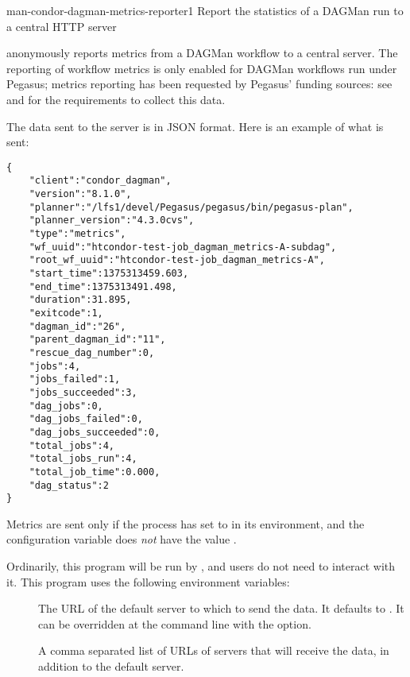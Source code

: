 \begin{ManPage}{}{man-condor-dagman-metrics-reporter}{1}
{Report the statistics of a DAGMan run to a central HTTP server}


\Synopsis {}

\Description

 anonymously reports metrics from
a DAGMan workflow to a central server.  The reporting of workflow metrics
is only enabled for DAGMan workflows run under Pegasus; metrics reporting
has been requested by Pegasus' funding sources:
see 
and 
for the requirements to collect this data.

The data sent to the server is in JSON format.  
Here is an example of what is sent:
\begin{verbatim}
{
    "client":"condor_dagman",
    "version":"8.1.0",
    "planner":"/lfs1/devel/Pegasus/pegasus/bin/pegasus-plan",
    "planner_version":"4.3.0cvs",
    "type":"metrics",
    "wf_uuid":"htcondor-test-job_dagman_metrics-A-subdag",
    "root_wf_uuid":"htcondor-test-job_dagman_metrics-A",
    "start_time":1375313459.603,
    "end_time":1375313491.498,
    "duration":31.895,
    "exitcode":1,
    "dagman_id":"26",
    "parent_dagman_id":"11",
    "rescue_dag_number":0,
    "jobs":4,
    "jobs_failed":1,
    "jobs_succeeded":3,
    "dag_jobs":0,
    "dag_jobs_failed":0,
    "dag_jobs_succeeded":0,
    "total_jobs":4,
    "total_jobs_run":4,
    "total_job_time":0.000,
    "dag_status":2
}
\end{verbatim}

Metrics are sent only if the  process has
 set to  in its environment,
and the  configuration variable does \emph{not}
have the value .

Ordinarily, this program will be run by , 
and users do not need to interact with it.
This program uses the following environment variables:
\begin{description}
  \item[]
    The URL of the default server to which to send the data.
    It defaults to .
    It can be overridden at the command line with the  option.
  \item[]
    A comma separated list of URLs of servers that will receive the
    data, in addition to the default server. 
\end{description}


\end{ManPage}
